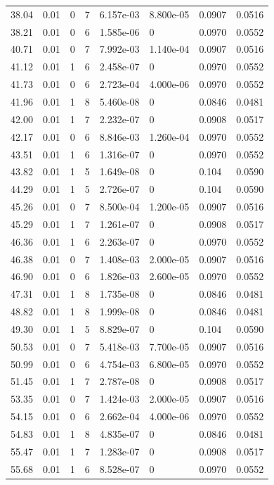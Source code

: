 \documentclass[preview]{standalone}
\begin{document}
{{{\begin{tabular}{L{1.2cm}C{1.2cm} C{0.3cm}C{0.5cm} C{1.4cm}C{1.4cm} C{1.4cm}C{1.4cm}}
  38.04  &  0.01  & 0     &  7 &  6.157e-03  & 8.800e-05  & 0.0907 &  0.0516   \\ 
  38.21  &  0.01  & 0     &  6 &  1.585e-06  & 0  & 0.0970 &  0.0552   \\ 
  40.71  &  0.01  & 0     &  7 &  7.992e-03  & 1.140e-04  & 0.0907 &  0.0516   \\ 
  41.12  &  0.01  & 1     &  6 &  2.458e-07  & 0  & 0.0970 &  0.0552   \\ 
  41.73  &  0.01  & 0     &  6 &  2.723e-04  & 4.000e-06  & 0.0970 &  0.0552   \\ 
  41.96  &  0.01  & 1     &  8 &  5.460e-08  & 0  & 0.0846 &  0.0481   \\ 
  42.00  &  0.01  & 1     &  7 &  2.232e-07  & 0  & 0.0908 &  0.0517   \\ 
  42.17  &  0.01  & 0     &  6 &  8.846e-03  & 1.260e-04  & 0.0970 &  0.0552   \\ 
  43.51  &  0.01  & 1     &  6 &  1.316e-07  & 0  & 0.0970 &  0.0552   \\ 
  43.82  &  0.01  & 1     &  5 &  1.649e-08  & 0  & 0.104 &  0.0590   \\ 
  44.29  &  0.01  & 1     &  5 &  2.726e-07  & 0  & 0.104 &  0.0590   \\ 
  45.26  &  0.01  & 0     &  7 &  8.500e-04  & 1.200e-05  & 0.0907 &  0.0516   \\ 
  45.29  &  0.01  & 1     &  7 &  1.261e-07  & 0  & 0.0908 &  0.0517   \\ 
  46.36  &  0.01  & 1     &  6 &  2.263e-07  & 0  & 0.0970 &  0.0552   \\ 
  46.38  &  0.01  & 0     &  7 &  1.408e-03  & 2.000e-05  & 0.0907 &  0.0516   \\ 
  46.90  &  0.01  & 0     &  6 &  1.826e-03  & 2.600e-05  & 0.0970 &  0.0552   \\ 
  47.31  &  0.01  & 1     &  8 &  1.735e-08  & 0  & 0.0846 &  0.0481   \\ 
  48.82  &  0.01  & 1     &  8 &  1.999e-08  & 0  & 0.0846 &  0.0481   \\ 
  49.30  &  0.01  & 1     &  5 &  8.829e-07  & 0  & 0.104 &  0.0590   \\ 
  50.53  &  0.01  & 0     &  7 &  5.418e-03  & 7.700e-05  & 0.0907 &  0.0516   \\ 
  50.99  &  0.01  & 0     &  6 &  4.754e-03  & 6.800e-05  & 0.0970 &  0.0552   \\ 
  51.45  &  0.01  & 1     &  7 &  2.787e-08  & 0  & 0.0908 &  0.0517   \\ 
  53.35  &  0.01  & 0     &  7 &  1.424e-03  & 2.000e-05  & 0.0907 &  0.0516   \\ 
  54.15  &  0.01  & 0     &  6 &  2.662e-04  & 4.000e-06  & 0.0970 &  0.0552   \\ 
  54.83  &  0.01  & 1     &  8 &  4.835e-07  & 0  & 0.0846 &  0.0481   \\ 
  55.47  &  0.01  & 1     &  7 &  1.283e-07  & 0  & 0.0908 &  0.0517   \\ 
  55.68  &  0.01  & 1     &  6 &  8.528e-07  & 0  & 0.0970 &  0.0552   \\ 
\hline 
\end{tabular} 

}}}
\end{document}
